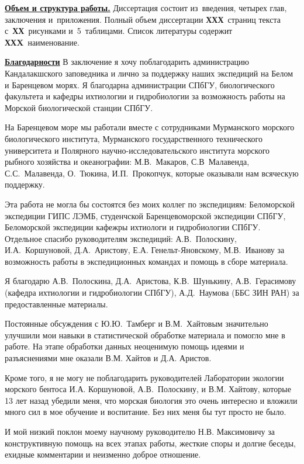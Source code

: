 \underline{\textbf{Объем и структура работы.}} Диссертация состоит из~введения, четырех глав, заключения и~приложения. Полный объем диссертации \textbf{ХХХ}~страниц текста с~\textbf{ХХ}~рисунками и~5~таблицами. Список литературы содержит \textbf{ХХX}~наименование.

\underline{\textbf{Благодарности}}
В заключение я хочу поблагодарить администрацию Кандалакшского заповедника и лично  за поддержку наших экспедиций на Белом и Баренцевом морях.
Я благодарна администрации СПбГУ, биологического факультета и кафедры ихтиологии и гидробиологии за возможность работы на Морской биологической станции СПбГУ.

На Баренцевом море мы работали вместе с сотрудниками Мурманского морского биологического института, Мурманского государственного технического университета и Полярного научно-исследовательского института морского рыбного хозяйства и океанографии: М.В.~Макаров, С.В~Малавенда, С.\:С.~Малавенда, О.~Тюкина, И.\:П.~Прокопчук, которые оказывали нам всяческую поддержку.  

Эта работа не могла бы состоятся без моих коллег по экспедициям: Беломорской экспедиции ГИПС ЛЭМБ, студенчской Баренцевоморской экспедиции СПбГУ, Беломорской экспедиции кафежры ихтиологи и гидробиологии СПбГУ. 
Отдельное спасибо руководителям экспедиций: А.\:В.~Полоскину, И.\:А.~Коршуновой, Д.\:А.~Аристову, Е.\:А. Генельт-Яновскому, М.В.~Иванову за возможность работы в экспедиционных командах и помощь в сборе материала.

Я благодарю А.\:В.~Полоскина, Д.\:А.~Аристова, К.\:В.~Шунькину, А.\:В.~Герасимову (кафедра ихтиологии и гидробиологии СПбГУ), А.\:Д.~Наумова (ББС ЗИН РАН) за предоставленные материалы.

Постоянные обсуждения с Ю.\:Ю.~Тамберг и В.\:М.~Хайтовым значительно улучшили мои навыки в статистической обработке материала и помогло мне в работе.
На этапе обработки данных неоценимую помощь идеями и разъяснениями мне оказали В.\:М. Хайтов и Д.\:А. Аристов.


Кроме того, я не могу не поблагодарить руководителей Лаборатории экологии морского бентоса И.\:А. Коршуновой, А.\:В.~Полоскину,  и В.\:М. Хайтову, которые 13 лет назад убедили меня, что морская биология это очень интересно и вложили много сил в мое обучение и воспитание. 
Без них меня бы тут просто не было.

И мой низкий поклон моему научному руководителю Н.\:В. Максимовичу за конструктивную помощь на всех этапах работы, жесткие споры и долгие беседы, ехидные комментарии и  неизменно доброе отношение.

